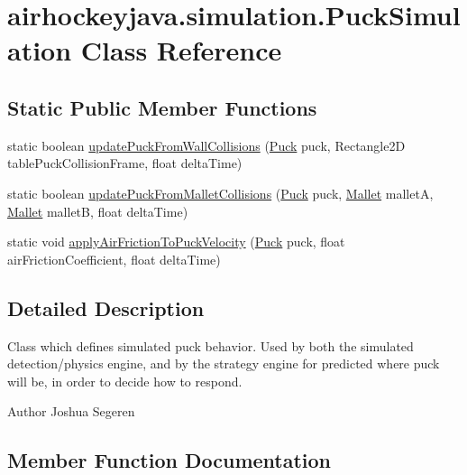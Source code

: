 \hypertarget{classairhockeyjava_1_1simulation_1_1_puck_simulation}{}\section{airhockeyjava.\+simulation.\+Puck\+Simulation Class Reference}
\label{classairhockeyjava_1_1simulation_1_1_puck_simulation}
\subsection*{Static Public Member Functions}
\begin{DoxyCompactItemize}
\item 
static boolean \hyperlink{classairhockeyjava_1_1simulation_1_1_puck_simulation_a2b27538e1061f9d71e7a795164940779}{update\+Puck\+From\+Wall\+Collisions} (\hyperlink{classairhockeyjava_1_1physical_1_1_puck}{Puck} puck, Rectangle2\+D table\+Puck\+Collision\+Frame, float delta\+Time)
\item 
static boolean \hyperlink{classairhockeyjava_1_1simulation_1_1_puck_simulation_a03787a040f5b9cd2a73bc86b86ddc90a}{update\+Puck\+From\+Mallet\+Collisions} (\hyperlink{classairhockeyjava_1_1physical_1_1_puck}{Puck} puck, \hyperlink{classairhockeyjava_1_1physical_1_1_mallet}{Mallet} mallet\+A, \hyperlink{classairhockeyjava_1_1physical_1_1_mallet}{Mallet} mallet\+B, float delta\+Time)
\item 
static void \hyperlink{classairhockeyjava_1_1simulation_1_1_puck_simulation_a0dcffcc03bd9d861e0e0c179ae4b6ad9}{apply\+Air\+Friction\+To\+Puck\+Velocity} (\hyperlink{classairhockeyjava_1_1physical_1_1_puck}{Puck} puck, float air\+Friction\+Coefficient, float delta\+Time)
\end{DoxyCompactItemize}


\subsection{Detailed Description}
Class which defines simulated puck behavior. Used by both the simulated detection/physics engine, and by the strategy engine for predicted where puck will be, in order to decide how to respond. \begin{DoxyAuthor}{Author}
Joshua Segeren 
\end{DoxyAuthor}


\subsection{Member Function Documentation}
\hypertarget{classairhockeyjava_1_1simulation_1_1_puck_simulation_a0dcffcc03bd9d861e0e0c179ae4b6ad9}{}
